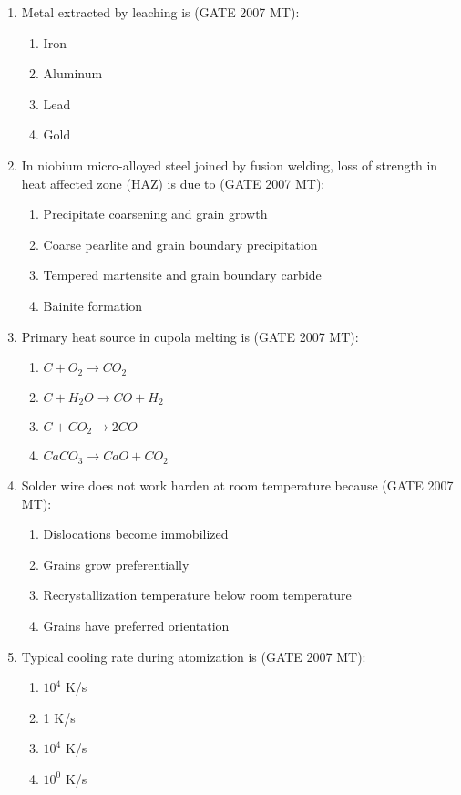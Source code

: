\documentclass[12pt]{article}
\begin{document}
\begin{enumerate}
\item Metal extracted by leaching is (GATE 2007 MT):
    \begin{enumerate}
        \item Iron
        \item Aluminum
        \item Lead
        \item Gold
    \end{enumerate}

\item In niobium micro-alloyed steel joined by fusion welding, loss of strength in heat affected zone (HAZ) is due to (GATE 2007 MT):
    \begin{enumerate}
        \item Precipitate coarsening and grain growth
        \item Coarse pearlite and grain boundary precipitation
        \item Tempered martensite and grain boundary carbide
        \item Bainite formation
    \end{enumerate}

\item Primary heat source in cupola melting is (GATE 2007 MT):
    \begin{enumerate}
        \item $C + O_2 \rightarrow CO_2$
        \item $C + H_2O \rightarrow CO + H_2$
        \item $C + CO_2 \rightarrow 2CO$
        \item $CaCO_3 \rightarrow CaO + CO_2$
    \end{enumerate}

\item Solder wire does not work harden at room temperature because (GATE 2007 MT):
    \begin{enumerate}
        \item Dislocations become immobilized
        \item Grains grow preferentially
        \item Recrystallization temperature below room temperature
        \item Grains have preferred orientation
    \end{enumerate}

\item Typical cooling rate during atomization is (GATE 2007 MT):
    \begin{enumerate}
        \item $10^{4}$ K/s
        \item 1 K/s
        \item $10^{4}$ K/s
        \item $10^{0}$ K/s
    \end{enumerate}


\end{enumerate}
\end{document}
